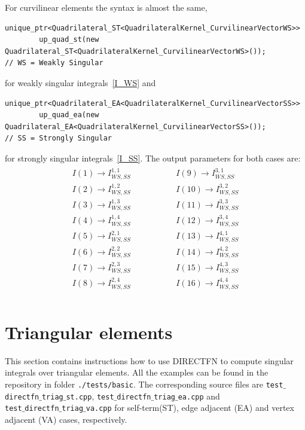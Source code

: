 \documentclass[a4wide,11pt]{article}
\renewcommand{\[}{\begin{equation}}
\renewcommand{\]}{\end{equation}}
\renewcommand{\{}{\begin{eqnarray}}
\renewcommand{\}}{\end{eqnarray}}
\begin{document}
For curvilinear elements the syntax is almost the same, 
\begin{verbatim}
unique_ptr<Quadrilateral_ST<QuadrilateralKernel_CurvilinearVectorWS>> 
        up_quad_st(new Quadrilateral_ST<QuadrilateralKernel_CurvilinearVectorWS>());
// WS = Weakly Singular
\end{verbatim}
for weakly singular integrals~\eqref{I_WS} and
\begin{verbatim}
unique_ptr<Quadrilateral_EA<QuadrilateralKernel_CurvilinearVectorSS>> 
        up_quad_ea(new Quadrilateral_EA<QuadrilateralKernel_CurvilinearVectorSS>());
// SS = Strongly Singular
\end{verbatim}
for strongly singular integrals~\eqref{I_SS}.
The output parameters for both cases are:
\[
\label{quad11}
\begin{matrix}
\begin{aligned}
I(1) \rightarrow I_{WS,SS}^{1,1}\\
I(2) \rightarrow I_{WS,SS}^{1,2}\\
I(3) \rightarrow I_{WS,SS}^{1,3}\\
I(4) \rightarrow I_{WS,SS}^{1,4}\\
I(5) \rightarrow I_{WS,SS}^{2,1}\\
I(6) \rightarrow I_{WS,SS}^{2,2}\\
I(7) \rightarrow I_{WS,SS}^{2,3}\\
I(8) \rightarrow I_{WS,SS}^{2,4}\\
\end{aligned}
&\quad\quad\quad &
\begin{aligned}
I(9) \rightarrow I_{WS,SS}^{3,1}\\
I(10) \rightarrow I_{WS,SS}^{3,2}\\
I(11) \rightarrow I_{WS,SS}^{3,3}\\
I(12) \rightarrow I_{WS,SS}^{3,4}\\
I(13) \rightarrow I_{WS,SS}^{4,1}\\
I(14) \rightarrow I_{WS,SS}^{4,2}\\
I(15) \rightarrow I_{WS,SS}^{4,3}\\
I(16) \rightarrow I_{WS,SS}^{4,4}\\
\end{aligned}
\end{matrix}
\]

\section{Triangular elements}
\label{Triangles}
This section contains instructions how to use DIRECTFN to compute singular integrals over triangular elements. All the examples can be found in the repository in folder \texttt{./tests/basic}. The corresponding source files are \texttt{test$\_$directfn$\_$triag$\_$st.cpp}, \texttt{test$\_$directfn$\_$triag$\_$ea.cpp} and \\\texttt{test$\_$directfn$\_$triag$\_$va.cpp} for self-term(ST), edge adjacent (EA) and vertex adjacent (VA) cases, respectively.
\end{document}
